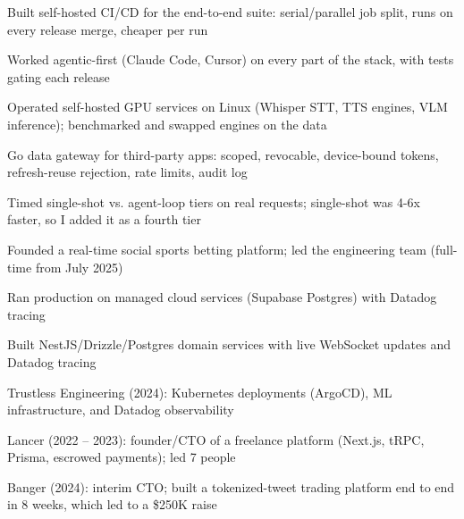 \documentclass[print]{jack-resume}
\begin{document}
\begin{tightemize}
    \item Built self-hosted CI/CD for the end-to-end suite: serial/parallel job split, runs on every release merge, cheaper per run
    \item Worked agentic-first (Claude Code, Cursor) on every part of the stack, with tests gating each release
    \item Operated self-hosted GPU services on Linux (Whisper STT, TTS engines, VLM inference); benchmarked and swapped engines on the data
    \item Go data gateway for third-party apps: scoped, revocable, device-bound tokens, refresh-reuse rejection, rate limits, audit log
    \item Timed single-shot vs. agent-loop tiers on real requests; single-shot was 4-6x faster, so I added it as a fourth tier
\end{tightemize}
\sectionsep

\begin{tightemize}
    \item Founded a real-time social sports betting platform; led the engineering team (full-time from July 2025)
    \item Ran production on managed cloud services (Supabase Postgres) with Datadog tracing
    \item Built NestJS/Drizzle/Postgres domain services with live WebSocket updates and Datadog tracing
\end{tightemize}
\sectionsep

\begin{tightemize}
    \item Trustless Engineering (2024): Kubernetes deployments (ArgoCD), ML infrastructure, and Datadog observability
    \item Lancer (2022 -- 2023): founder/CTO of a freelance platform (Next.js, tRPC, Prisma, escrowed payments); led 7 people
    \item Banger (2024): interim CTO; built a tokenized-tweet trading platform end to end in 8 weeks, which led to a \$250K raise
\end{tightemize}
\sectionsep
\end{document}
